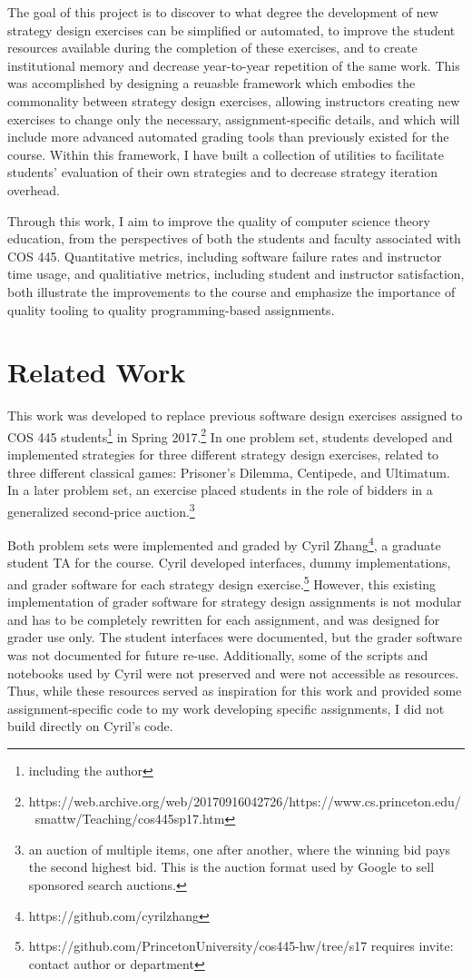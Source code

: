 \documentclass[pageno]{jpaper}
\begin{document}
The goal of this project is to discover to what degree the development of new strategy design exercises can be simplified or automated, to improve the student resources available during the completion of these exercises, and to create institutional memory and decrease year-to-year repetition of the same work.
This was accomplished by designing a reuasble framework which embodies the commonality between strategy design exercises, allowing instructors creating new exercises to change only the necessary, assignment-specific details, and which will include more advanced automated grading tools than previously existed for the course.
Within this framework, I have built a collection of utilities to facilitate students' evaluation of their own strategies and to decrease strategy iteration overhead.

Through this work, I aim to improve the quality of computer science theory education, from the perspectives of both the students and faculty associated with COS 445.
Quantitative metrics, including software failure rates and instructor time usage, and qualitiative metrics, including student and instructor satisfaction, both illustrate the improvements to the course and emphasize the importance of quality tooling to quality programming-based assignments.

\section*{Related Work}
This work was developed to replace previous software design exercises assigned to COS 445 students\footnote{including the author} in Spring 2017.\footnote{https://web.archive.org/web/20170916042726/https://www.cs.princeton.edu/~smattw/Teaching/cos445sp17.htm}
In one problem set, students developed and implemented strategies for three different strategy design exercises, related to three different classical games: Prisoner's Dilemma, Centipede, and Ultimatum.
In a later problem set, an exercise placed students in the role of bidders in a generalized second-price auction.\footnote{an auction of multiple items, one after another, where the winning bid pays the second highest bid. This is the auction format used by Google to sell sponsored search auctions.}

Both problem sets were implemented and graded by Cyril Zhang\footnote{https://github.com/cyrilzhang}, a graduate student TA for the course.
Cyril developed interfaces, dummy implementations, and grader software for each strategy design exercise.\footnote{https://github.com/PrincetonUniversity/cos445-hw/tree/s17 requires invite: contact author or department}
However, this existing implementation of grader software for strategy design assignments is not modular and has to be completely rewritten for each assignment, and was designed for grader use only.
The student interfaces were documented, but the grader software was not documented for future re-use.
Additionally, some of the scripts and notebooks used by Cyril were not preserved and were not accessible as resources.
Thus, while these resources served as inspiration for this work and provided some assignment-specific code to my work developing specific assignments, I did not build directly on Cyril's code.
\end{document}
